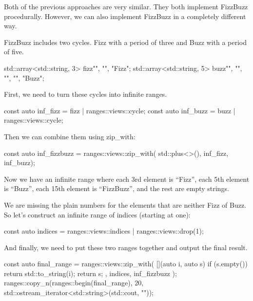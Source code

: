 Both of the previous approaches are very similar. They both implement FizzBuzz procedurally. However, we can also implement FizzBuzz in a completely different way.

FizzBuzz includes two cycles. Fizz with a period of three and Buzz with a period of five.

\begin{box-note}
\begin{cppcode}
std::array<std::string, 3> fizz{"", "", "Fizz"};
std::array<std::string, 5> buzz{"", "", "", "", "Buzz"};
\end{cppcode}
\end{box-note}

First, we need to turn these cycles into infinite ranges.

\begin{box-note}
\begin{cppcode}
const auto inf_fizz = fizz | ranges::views::cycle;
const auto inf_buzz = buzz | ranges::views::cycle;
\end{cppcode}
\end{box-note}

Then we can combine them using zip\_with:

\begin{box-note}
\begin{cppcode}
const auto inf_fizzbuzz = ranges::views::zip_with(
    std::plus<>(), 
    inf_fizz, 
    inf_buzz);
\end{cppcode}
\end{box-note}

Now we have an infinite range where each 3rd element is “Fizz”, each 5th element is “Buzz”, each 15th element is “FizzBuzz”, and the rest are empty strings.

We are missing the plain numbers for the elements that are neither Fizz of Buzz. So let’s construct an infinite range of indices (starting at one):

\begin{box-note}
\begin{cppcode}
const auto indices = ranges::views::indices
    | ranges::views::drop(1);
\end{cppcode}
\end{box-note}

And finally, we need to put these two ranges together and output the final result.

\begin{box-note}
\begin{cppcode}
const auto final_range = ranges::views::zip_with(
    [](auto i, auto s) { 
        if (s.empty()) return std::to_string(i); 
        return s;
    },
    indices,
    inf_fizzbuzz
);
ranges::copy_n(ranges::begin(final_range), 20,
    std::ostream_iterator<std::string>(std::cout, "\n"));
\end{cppcode}
\end{box-note}